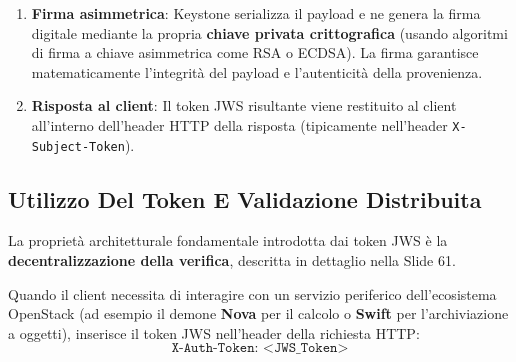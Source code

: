 \documentclass[11pt, a4paper]{article}
\begin{document}
\begin{enumerate}
    \item \textbf{Firma asimmetrica}: Keystone serializza il payload e ne genera la firma digitale mediante la propria \textbf{chiave privata crittografica} (usando algoritmi di firma a chiave asimmetrica come RSA o ECDSA). La firma garantisce matematicamente l'integrità del payload e l'autenticità della provenienza.

    \item \textbf{Risposta al client}: Il token JWS risultante viene restituito al client all'interno dell'header HTTP della risposta (tipicamente nell'header \texttt{X-Subject-Token}).
\end{enumerate}

\subsection{Utilizzo Del Token E Validazione Distribuita}

La proprietà architetturale fondamentale introdotta dai token JWS è la \textbf{decentralizzazione della verifica}, descritta in dettaglio nella Slide 61.


Quando il client necessita di interagire con un servizio periferico dell'ecosistema OpenStack (ad esempio il demone \textbf{Nova} per il calcolo o \textbf{Swift} per l'archiviazione a oggetti), inserisce il token JWS nell'header della richiesta HTTP:
\[
\texttt{X-Auth-Token: <JWS\_Token>}
\]
\end{document}
